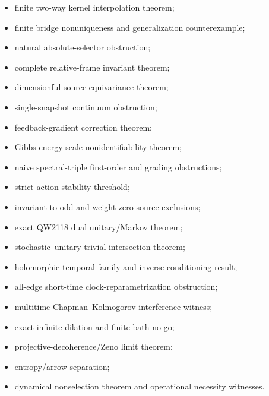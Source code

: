 \documentclass[11pt,a4paper,openany]{report}
\begin{document}
\begin{itemize}
\item 
finite two-way kernel interpolation theorem;

\item 
finite bridge nonuniqueness and generalization counterexample;

\item 
natural absolute-selector obstruction;

\item 
complete relative-frame invariant theorem;

\item 
dimensionful-source equivariance theorem;

\item 
single-snapshot continuum obstruction;

\item 
feedback-gradient correction theorem;

\item 
Gibbs energy-scale nonidentifiability theorem;

\item 
naive spectral-triple first-order and grading obstructions;

\item 
strict action stability threshold;

\item 
invariant-to-odd and weight-zero source exclusions;

\item 
exact QW2118 dual unitary/\allowbreak{}Markov theorem;

\item 
stochastic–unitary trivial-intersection theorem;

\item 
holomorphic temporal-family and inverse-conditioning result;

\item 
all-edge short-time clock-reparametrization obstruction;

\item 
multitime Chapman–Kolmogorov interference witness;

\item 
exact infinite dilation and finite-bath no-go;

\item 
projective-decoherence/\allowbreak{}Zeno limit theorem;

\item 
entropy/\allowbreak{}arrow separation;

\item 
dynamical nonselection theorem and operational necessity witnesses.

\end{itemize}
\end{document}
